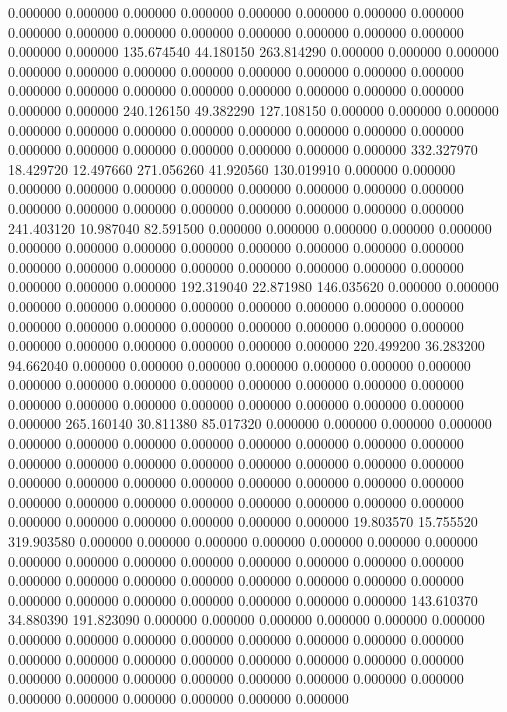 0.000000 0.000000 0.000000
0.000000 0.000000 0.000000
0.000000 0.000000 0.000000
0.000000 0.000000 0.000000
0.000000 0.000000 0.000000
0.000000 0.000000 0.000000
135.674540 44.180150 263.814290
0.000000 0.000000 0.000000
0.000000 0.000000 0.000000
0.000000 0.000000 0.000000
0.000000 0.000000 0.000000
0.000000 0.000000 0.000000
0.000000 0.000000 0.000000
0.000000 0.000000 0.000000
240.126150 49.382290 127.108150
0.000000 0.000000 0.000000
0.000000 0.000000 0.000000
0.000000 0.000000 0.000000
0.000000 0.000000 0.000000
0.000000 0.000000 0.000000
0.000000 0.000000 0.000000
332.327970 18.429720 12.497660
271.056260 41.920560 130.019910
0.000000 0.000000 0.000000
0.000000 0.000000 0.000000
0.000000 0.000000 0.000000
0.000000 0.000000 0.000000
0.000000 0.000000 0.000000
0.000000 0.000000 0.000000
241.403120 10.987040 82.591500
0.000000 0.000000 0.000000
0.000000 0.000000 0.000000
0.000000 0.000000 0.000000
0.000000 0.000000 0.000000
0.000000 0.000000 0.000000
0.000000 0.000000 0.000000
0.000000 0.000000 0.000000
0.000000 0.000000 0.000000
192.319040 22.871980 146.035620
0.000000 0.000000 0.000000
0.000000 0.000000 0.000000
0.000000 0.000000 0.000000
0.000000 0.000000 0.000000
0.000000 0.000000 0.000000
0.000000 0.000000 0.000000
0.000000 0.000000 0.000000
0.000000 0.000000 0.000000
220.499200 36.283200 94.662040
0.000000 0.000000 0.000000
0.000000 0.000000 0.000000
0.000000 0.000000 0.000000
0.000000 0.000000 0.000000
0.000000 0.000000 0.000000
0.000000 0.000000 0.000000
0.000000 0.000000 0.000000
0.000000 0.000000 0.000000
265.160140 30.811380 85.017320
0.000000 0.000000 0.000000
0.000000 0.000000 0.000000
0.000000 0.000000 0.000000
0.000000 0.000000 0.000000
0.000000 0.000000 0.000000
0.000000 0.000000 0.000000
0.000000 0.000000 0.000000
0.000000 0.000000 0.000000
0.000000 0.000000 0.000000
0.000000 0.000000 0.000000
0.000000 0.000000 0.000000
0.000000 0.000000 0.000000
0.000000 0.000000 0.000000
0.000000 0.000000 0.000000
19.803570 15.755520 319.903580
0.000000 0.000000 0.000000
0.000000 0.000000 0.000000
0.000000 0.000000 0.000000
0.000000 0.000000 0.000000
0.000000 0.000000 0.000000
0.000000 0.000000 0.000000
0.000000 0.000000 0.000000
0.000000 0.000000 0.000000
0.000000 0.000000 0.000000
0.000000 0.000000 0.000000
143.610370 34.880390 191.823090
0.000000 0.000000 0.000000
0.000000 0.000000 0.000000
0.000000 0.000000 0.000000
0.000000 0.000000 0.000000
0.000000 0.000000 0.000000
0.000000 0.000000 0.000000
0.000000 0.000000 0.000000
0.000000 0.000000 0.000000
0.000000 0.000000 0.000000
0.000000 0.000000 0.000000
0.000000 0.000000 0.000000
0.000000 0.000000 0.000000
